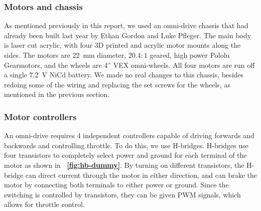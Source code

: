 \documentclass[letterpaper, 11pt]{article}
\newcommand*{\figref}[1]{\textbf{\figurename~\ref{#1}}}
\begin{document}
\subsubsection{Motors and chassis}
As mentioned previously in this report, we used an omni-drive chassis that had already been built last year by Ethan Gordon and Luke Pfleger. The main body is laser cut acrylic, with four 3D printed and acrylic motor mounts along the sides. The motors are \SI{22}{mm} diameter, $20.4:1$ geared, high power Pololu Gearmotors, and the wheels are 4'' VEX omni-wheels. All four motors are run off a single \SI{7.2}{\volt} NiCd battery. We made no real changes to this chassis, besides redoing some of the wiring and replacing the set screws for the wheels, as mentioned in the previous section.

\subsubsection{Motor controllers}
\label{sec:hbridge}
An omni-drive requires 4 independent controllers capable of driving forwards and backwards and controlling throttle. To do this, we use H-bridges. H-bridges use four transistors to completely select power and ground for each terminal of the motor as shown in \figref{fig:hb-dummy}. By turning on different transistors, the H-bridge can direct current through the motor in either direction, and can brake the motor by connecting both terminals to either power or ground. Since the switching is controlled by transistors, they can be given PWM signals, which allows for throttle control.
\end{document}
